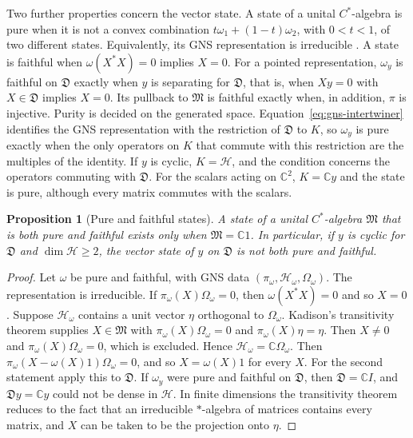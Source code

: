 \documentclass[11pt]{article}
\newtheorem{proposition}{Proposition}[section]
\theoremstyle{definition}
\newcommand{\C}{\mathbb C}
\begin{document}
Two further properties concern the vector state. A state of a unital $C^*$-algebra is pure when it is not a convex combination $t\omega_1+(1-t)\omega_2$, with $0<t<1$, of two different states. Equivalently, its GNS representation is irreducible \cite{BratteliRobinson}. A state is faithful when $\omega(X^*X)=0$ implies $X=0$. For a pointed representation, $\omega_y$ is faithful on $\mathfrak D$ exactly when $y$ is separating for $\mathfrak D$, that is, when $Xy=0$ with $X\in\mathfrak D$ implies $X=0$. Its pullback to $\mathfrak M$ is faithful exactly when, in addition, $\pi$ is injective. Purity is decided on the generated space. Equation~\eqref{eq:gns-intertwiner} identifies the GNS representation with the restriction of $\mathfrak D$ to $K$, so $\omega_y$ is pure exactly when the only operators on $K$ that commute with this restriction are the multiples of the identity. If $y$ is cyclic, $K=\mathcal H$, and the condition concerns the operators commuting with $\mathfrak D$. For the scalars acting on $\C^2$, $K=\C y$ and the state is pure, although every matrix commutes with the scalars.

\begin{proposition}[Pure and faithful states]
\label{prop:pure-faithful-scalars}
A state of a unital $C^*$-algebra $\mathfrak M$ that is both pure and faithful exists only when $\mathfrak M=\C1$. In particular, if $y$ is cyclic for $\mathfrak D$ and $\dim\mathcal H\geq2$, the vector state of $y$ on $\mathfrak D$ is not both pure and faithful.
\end{proposition}
\begin{proof}
Let $\omega$ be pure and faithful, with GNS data $(\pi_\omega,\mathcal H_\omega,\Omega_\omega)$. The representation is irreducible. If $\pi_\omega(X)\Omega_\omega=0$, then $\omega(X^*X)=0$ and so $X=0$. Suppose $\mathcal H_\omega$ contains a unit vector $\eta$ orthogonal to $\Omega_\omega$. Kadison's transitivity theorem \cite{Kadison1957} supplies $X\in\mathfrak M$ with $\pi_\omega(X)\Omega_\omega=0$ and $\pi_\omega(X)\eta=\eta$. Then $X\ne0$ and $\pi_\omega(X)\Omega_\omega=0$, which is excluded. Hence $\mathcal H_\omega=\C\Omega_\omega$. Then $\pi_\omega(X-\omega(X)1)\Omega_\omega=0$, and so $X=\omega(X)1$ for every $X$. For the second statement apply this to $\mathfrak D$. If $\omega_y$ were pure and faithful on $\mathfrak D$, then $\mathfrak D=\C I$, and $\mathfrak Dy=\C y$ could not be dense in $\mathcal H$. In finite dimensions the transitivity theorem reduces to the fact that an irreducible $*$-algebra of matrices contains every matrix, and $X$ can be taken to be the projection onto $\eta$.
\end{proof}
\end{document}
